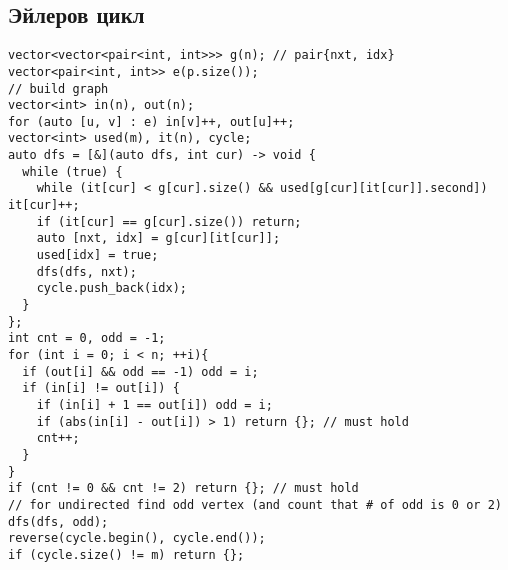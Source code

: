 \subsection{Эйлеров цикл}
\begin{lstlisting}
vector<vector<pair<int, int>>> g(n); // pair{nxt, idx}
vector<pair<int, int>> e(p.size());
// build graph
vector<int> in(n), out(n);
for (auto [u, v] : e) in[v]++, out[u]++;
vector<int> used(m), it(n), cycle;
auto dfs = [&](auto dfs, int cur) -> void {
  while (true) {
    while (it[cur] < g[cur].size() && used[g[cur][it[cur]].second]) it[cur]++;
    if (it[cur] == g[cur].size()) return;
    auto [nxt, idx] = g[cur][it[cur]];
    used[idx] = true;
    dfs(dfs, nxt);
    cycle.push_back(idx);
  }
};
int cnt = 0, odd = -1;
for (int i = 0; i < n; ++i){
  if (out[i] && odd == -1) odd = i;
  if (in[i] != out[i]) {
    if (in[i] + 1 == out[i]) odd = i;
    if (abs(in[i] - out[i]) > 1) return {}; // must hold
    cnt++;
  }
}
if (cnt != 0 && cnt != 2) return {}; // must hold
// for undirected find odd vertex (and count that # of odd is 0 or 2)
dfs(dfs, odd);
reverse(cycle.begin(), cycle.end());
if (cycle.size() != m) return {};
\end{lstlisting}
